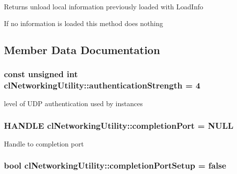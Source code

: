 \label{classcl_networking_utility_acdc7e675cebdca790279a7ba79f28aae}
\begin{DoxyReturn}{Returns}
unload local information previously loaded with LoadInfo \par
 If no information is loaded this method does nothing 
\end{DoxyReturn}


\subsection{Member Data Documentation}
\hypertarget{classcl_networking_utility_aa48d05605a3161f1b99b1dac14e05774}{
\subsubsection[{authenticationStrength}]{\setlength{\rightskip}{0pt plus 5cm}const unsigned int {\bf clNetworkingUtility::authenticationStrength} = 4}}
\label{classcl_networking_utility_aa48d05605a3161f1b99b1dac14e05774}
level of UDP authentication used by instances \hypertarget{classcl_networking_utility_a0c6d125c3ce6d61803f1ae71d1f5a84d}{
\subsubsection[{completionPort}]{\setlength{\rightskip}{0pt plus 5cm}HANDLE {\bf clNetworkingUtility::completionPort} = NULL}}
\label{classcl_networking_utility_a0c6d125c3ce6d61803f1ae71d1f5a84d}
Handle to completion port \hypertarget{classcl_networking_utility_a8af49cca32d17b16891952a7ec3d7fa2}{
\subsubsection[{completionPortSetup}]{\setlength{\rightskip}{0pt plus 5cm}bool {\bf clNetworkingUtility::completionPortSetup} = false}}
